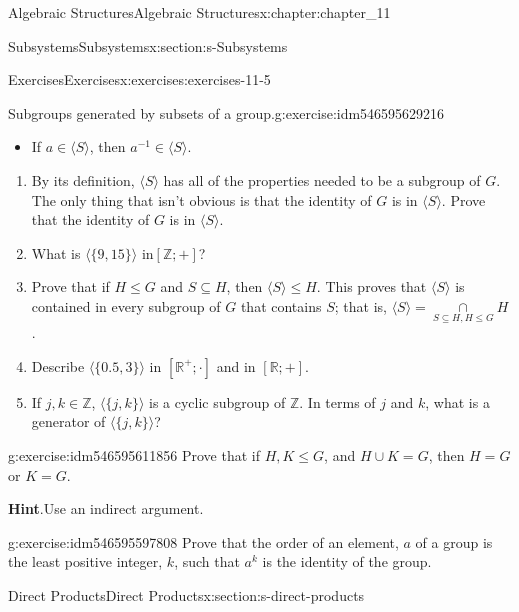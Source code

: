 \documentclass[oneside,10pt,]{book}
\newcommand{\blocktitlefont}{\relax}
\numberwithin{equation}{section}
\begin{document}
\begin{chapterptx}{Algebraic Structures}{}{Algebraic Structures}{}{}{x:chapter:chapter_11}
\begin{sectionptx}{Subsystems}{}{Subsystems}{}{}{x:section:s-Subsystems}
\begin{exercises-subsection}{Exercises}{}{Exercises}{}{}{x:exercises:exercises-11-5}
\begin{divisionexercise}{6}{Subgroups generated by subsets of a group.}{}{g:exercise:idm546595629216}
\begin{itemize}[label=\textbullet]
\item{}If \(a \in \langle S \rangle\), then \(a^{-1}\in \langle S \rangle\).%
\end{itemize}
%
\par
%
\begin{enumerate}[label=(\alph*)]
\item{}By its definition, \(\langle S \rangle\)  has all of the properties needed to be a subgroup of \(G\). The only thing that isn't obvious is that the identity of \(G\) is in \(\langle S \rangle\).  Prove that the identity of \(G\) is in \(\langle S \rangle\).%
\item{}What is \(\langle\{9, 15\}\rangle\) in\([\mathbb{Z}; +]\)?%
\item{}Prove that if \(H \leq  G\) and \(S \subseteq  H\), then \(\langle S \rangle\leq H\). This proves that \(\langle S \rangle\) is contained in every subgroup of \(G\) that contains \(S\); that is, \(\langle S \rangle =\underset{S\subseteq H, H\leq G}{\cap }H\).%
\item{}Describe \(\langle \{0.5, 3\}\rangle \) in \(\left[ \mathbb{R}^+;\cdot \right]\) and in \([\mathbb{R}; +]\).%
\item{}If \(j, k \in  \mathbb{Z}\), \(\langle\{j,k\}\rangle\) is a cyclic subgroup of \(\mathbb{Z}\). In terms of \(j\) and \(k\), what is a generator of \(\langle \{j, k\}\rangle \)?%
\end{enumerate}
%
\end{divisionexercise}%
\begin{divisionexercise}{7}{}{}{g:exercise:idm546595611856}%
Prove that if \(H,K \leq  G\), and \(H\cup K=G\), then \(H = G\) or \(K = G\).%
\par\smallskip%
\noindent\textbf{\blocktitlefont Hint}.\hypertarget{g:hint:idm546595606960}{}\quad{}Use an indirect argument.%
\end{divisionexercise}%
\begin{divisionexercise}{8}{}{}{g:exercise:idm546595597808}%
Prove that the order of an element, \(a\) of a group is the least positive integer, \(k\), such that \(a^k\) is the identity of the group.%
\end{divisionexercise}%
\end{exercises-subsection}
\end{sectionptx}
%
%
\typeout{************************************************}
\typeout{************************************************}
%
\begin{sectionptx}{Direct Products}{}{Direct Products}{}{}{x:section:s-direct-products}

\end{sectionptx}
\end{chapterptx}
\end{document}
